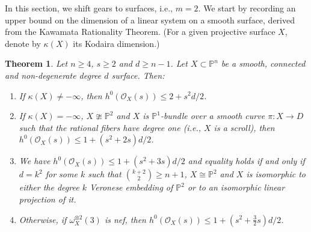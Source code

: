 \documentclass[a4, 11pt]{amsart}
\theoremstyle{plain}
\newtheorem{theorem}{Theorem}[section]
\theoremstyle{definition}
\newcommand{\enm}[1]{\ensuremath{#1}}          %
\newcommand{\cal}[1]{\mathcal{#1}}
\newcommand{\PP}{\enm{\mathbb{P}}}
\newcommand{\Oo}{\enm{\cal{O}}}
\begin{document}
In this section, we shift gears to surfaces, i.e., $m=2$. We start by recording an upper bound on the dimension of a linear system on a smooth surface, derived from the Kawamata Rationality Theorem. (For a given projective surface $X$, denote by $\kappa(X)$ its Kodaira dimension.)

\begin{theorem}\label{ma1}
Let $n\ge 4$, $s\ge 2$ and $d\ge n-1$. Let $X\subset \PP^n$ be a  smooth, connected and non-degenerate degree $d$ surface. Then:
\begin{enumerate}

\item[(i)] If $\kappa (X)\ne -\infty$, then $h^0(\Oo _X(s)) \le 2+s^2d/2$. 

\item[(ii)] If $\kappa(X) = -\infty$, $X\ncong \PP^2$ and $X$ is $\PP^1$-bundle over a smooth curve $\pi: X\rightarrow D$ such that the rational fibers have degree one (i.e., $X$ is a scroll), then $h^0(\Oo _X(s)) \le 1 + (s^2+2s)d/2$. 

\item[(iii)] We have $h^0(\Oo _X(s)) \le 1 + (s^2+3s)d/2$ and equality holds if and only if $d=k^2$ for some $k$ such that
$\binom{k+2}{2}\ge n+1$, $X\cong \PP^2$ and $X$ is isomorphic to either the degree $k$ Veronese embedding of $\PP^2$ or to
an isomorphic linear projection of it. 

\item[(iv)] Otherwise, if $\omega_X^{\otimes 2}(3)$ is nef, then $h^0(\Oo _X(s)) \le 1 + (s^2+\frac{3}{2}s)d/2$. 
\end{enumerate}
\end{theorem}
\end{document}
